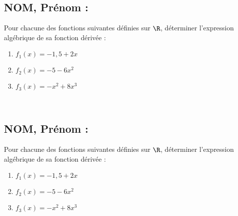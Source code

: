 \documentclass[a4paper,11pt,exos]{nsi} %
\begin{document}
\subsection*{NOM, Prénom : \dotfill} 


\maketitle




\begin{exercice}
    Pour chacune des fonctions suivantes définies sur $\R$, déterminer l'expression algébrique de sa fonction dérivée :
    \begin{multicols}{3}
        \begin{enumerate}
            \item $f_1(x)=-1{,}5+2x$
        
            \item $f_2(x)= -5-6x^2$
            \item $f_3(x)= -x^2+8x^3$
        \end{enumerate}
    \end{multicols}
    
    \end{exercice}

\\



\subsection*{NOM, Prénom : \dotfill} 


\maketitle




\begin{exercice}
    Pour chacune des fonctions suivantes définies sur $\R$, déterminer l'expression algébrique de sa fonction dérivée :
    \begin{multicols}{3}
        \begin{enumerate}
            \item $f_1(x)=-1{,}5+2x$
        
            \item $f_2(x)= -5-6x^2$
            \item $f_3(x)= -x^2+8x^3$
        \end{enumerate}
    \end{multicols}
    
    \end{exercice}

\end{document}
